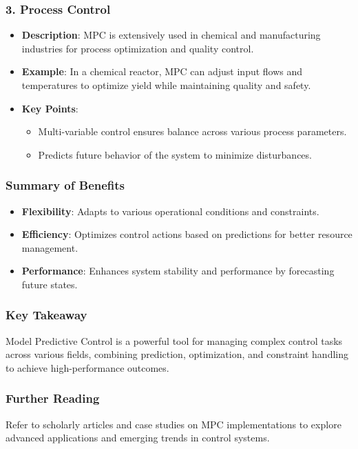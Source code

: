 \documentclass[aspectratio=169]{beamer}
\begin{document}
\begin{frame}[fragile]
    \frametitle{3. Process Control}
    \begin{itemize}
        \item \textbf{Description}: MPC is extensively used in chemical and manufacturing industries for process optimization and quality control.
        \item \textbf{Example}: In a chemical reactor, MPC can adjust input flows and temperatures to optimize yield while maintaining quality and safety.
        \item \textbf{Key Points}:
        \begin{itemize}
            \item Multi-variable control ensures balance across various process parameters.
            \item Predicts future behavior of the system to minimize disturbances.
        \end{itemize}
    \end{itemize}
\end{frame}

\begin{frame}[fragile]
    \frametitle{Summary of Benefits}
    \begin{itemize}
        \item \textbf{Flexibility}: Adapts to various operational conditions and constraints.
        \item \textbf{Efficiency}: Optimizes control actions based on predictions for better resource management.
        \item \textbf{Performance}: Enhances system stability and performance by forecasting future states.
    \end{itemize}
\end{frame}

\begin{frame}[fragile]
    \frametitle{Key Takeaway}
    Model Predictive Control is a powerful tool for managing complex control tasks across various fields, combining prediction, optimization, and constraint handling to achieve high-performance outcomes.
\end{frame}

\begin{frame}[fragile]
    \frametitle{Further Reading}
    Refer to scholarly articles and case studies on MPC implementations to explore advanced applications and emerging trends in control systems.
\end{frame}
\end{document}
